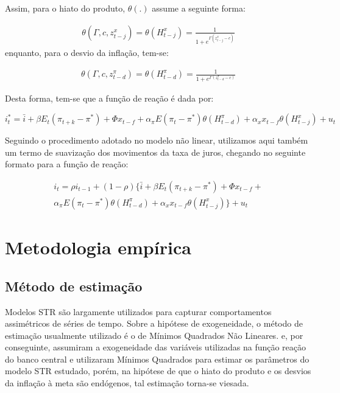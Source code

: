 \documentclass[
	article,			%
	11pt,				%
	oneside,			%
	a4paper,			%
	english,			%
	brazil,				%
	]{abntex2}
\begin{document}
	Assim, para o hiato do produto, $\theta(.)$ assume a seguinte forma:
	
	\begin{eqnarray}  \label{func_log_hiato}
		\theta (\Gamma,c,z_{t-j}^x) = \theta (H_{t-j}^x) = \frac{1}{1+e^{\Gamma (z_{t-j}^x - c)}} 
	\end{eqnarray}
	enquanto, para o desvio da inflação, tem-se:
	
	\begin{eqnarray}  \label{func_log_inflacao}
		\theta (\Gamma,c,z_{t-d}^\pi) = \theta (H_{t-d}^\pi) = \frac{1}{1+e^{\Gamma (z_{t-d}^\pi - c)}} 
	\end{eqnarray}
	
	Desta forma, tem-se que a função de reação é dada por:
	
	\begin{equation}
		i_t^* = \bar{i} + \beta E_t(\pi_{t+k} - \pi^*) + \Phi x_{t-f} + \alpha_\pi E(\pi_t - \pi^*)\theta(H_{t-d}^\pi) + \alpha_x x_{t-f} \theta (H_{t-j}^x) + u_t
	\end{equation}
	
	Seguindo o procedimento adotado no modelo não linear, utilizamos aqui também um termo de suavização dos movimentos da taxa de juros, chegando no seguinte formato para a função de reação:
	
	\begin{eqnarray}  \label{modelo_nao_linear}
		i_t = \rho i_{t-1} + (1-\rho) \{ \bar{i} + \beta E_t(\pi_{t+k} - \pi^*) + \Phi x_{t-f} + \nonumber \\ 
		 \alpha_\pi E(\pi_t - \pi^*)\theta(H_{t-d}^\pi) + \alpha_x x_{t-f} \theta (H_{t-j}^x) \} + u_t
	\end{eqnarray}
	


	
	\section{Metodologia empírica}	
	
	\subsection{Método de estimação}
	
	Modelos STR são largamente utilizados para capturar comportamentos assimétricos de séries de tempo. Sobre a hipótese de exogeneidade, o método de estimação usualmente utilizado é o de Mínimos Quadrados Não Lineares.  e, por conseguinte,  assumiram a exogeneidade das variáveis utilizadas na função reação do banco central e utilizaram Mínimos Quadrados para estimar os parâmetros do modelo STR estudado, porém, na hipótese de que o hiato do produto e os desvios da inflação à meta são endógenos, tal estimação torna-se viesada.
	
\end{document}
